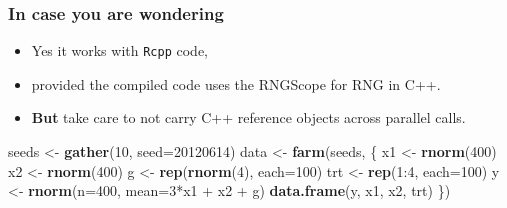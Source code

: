 \documentclass[ignorenonframetext,]{beamer}
\newenvironment{Shaded}{}{}
\newcommand{\KeywordTok}[1]{\textcolor[rgb]{0.00,0.44,0.13}{\textbf{{#1}}}}
\newcommand{\DataTypeTok}[1]{\textcolor[rgb]{0.56,0.13,0.00}{{#1}}}
\newcommand{\DecValTok}[1]{\textcolor[rgb]{0.25,0.63,0.44}{{#1}}}
\newcommand{\NormalTok}[1]{{#1}}
\begin{document}
\begin{frame}[fragile]\frametitle{In case you are wondering}

\begin{itemize}
\item
  Yes it works with \texttt{Rcpp} code,
\item
  provided the compiled code uses the RNGScope for RNG in C++.
\item
  \textbf{But} take care to not carry C++ reference objects across
  parallel calls.
\end{itemize}
\begin{Shaded}
\begin{Highlighting}[]
\NormalTok{seeds <- }\KeywordTok{gather}\NormalTok{(}\DecValTok{10}\NormalTok{, }\DataTypeTok{seed=}\DecValTok{20120614}\NormalTok{)}
\NormalTok{data <- }\KeywordTok{farm}\NormalTok{(seeds, \{}
\NormalTok{x1 <- }\KeywordTok{rnorm}\NormalTok{(}\DecValTok{400}\NormalTok{)}
\NormalTok{x2 <- }\KeywordTok{rnorm}\NormalTok{(}\DecValTok{400}\NormalTok{)}
\NormalTok{g <- }\KeywordTok{rep}\NormalTok{(}\KeywordTok{rnorm}\NormalTok{(}\DecValTok{4}\NormalTok{), }\DataTypeTok{each=}\DecValTok{100}\NormalTok{)}
\NormalTok{trt <- }\KeywordTok{rep}\NormalTok{(}\DecValTok{1}\NormalTok{:}\DecValTok{4}\NormalTok{, }\DataTypeTok{each=}\DecValTok{100}\NormalTok{)}
\NormalTok{y <- }\KeywordTok{rnorm}\NormalTok{(}\DataTypeTok{n=}\DecValTok{400}\NormalTok{, }\DataTypeTok{mean=}\DecValTok{3}\NormalTok{*x1 + x2 + g)}
\KeywordTok{data.frame}\NormalTok{(y, x1, x2, trt)}
\NormalTok{\})}
\end{Highlighting}
\end{Shaded}
\end{frame}
 
\end{document}
